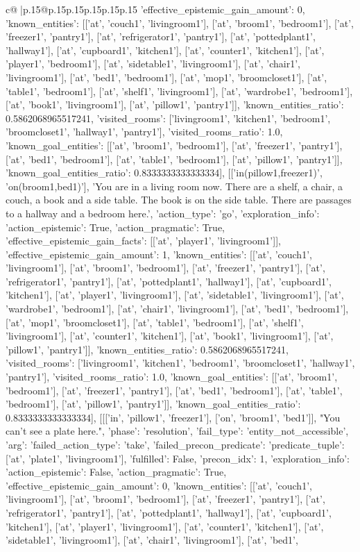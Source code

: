 \documentclass{article}
\begin{document}
{\begin{supertabular}{c@{$\;$}|p{.15\linewidth}@{}p{.15\linewidth}p{.15\linewidth}p{.15\linewidth}p{.15\linewidth}p{.15\linewidth}}
{{{'effective_epistemic_gain_amount': 0, 'known_entities': [['at', 'couch1', 'livingroom1'], ['at', 'broom1', 'bedroom1'], ['at', 'freezer1', 'pantry1'], ['at', 'refrigerator1', 'pantry1'], ['at', 'pottedplant1', 'hallway1'], ['at', 'cupboard1', 'kitchen1'], ['at', 'counter1', 'kitchen1'], ['at', 'player1', 'bedroom1'], ['at', 'sidetable1', 'livingroom1'], ['at', 'chair1', 'livingroom1'], ['at', 'bed1', 'bedroom1'], ['at', 'mop1', 'broomcloset1'], ['at', 'table1', 'bedroom1'], ['at', 'shelf1', 'livingroom1'], ['at', 'wardrobe1', 'bedroom1'], ['at', 'book1', 'livingroom1'], ['at', 'pillow1', 'pantry1']], 'known_entities_ratio': 0.5862068965517241, 'visited_rooms': ['livingroom1', 'kitchen1', 'bedroom1', 'broomcloset1', 'hallway1', 'pantry1'], 'visited_rooms_ratio': 1.0, 'known_goal_entities': [['at', 'broom1', 'bedroom1'], ['at', 'freezer1', 'pantry1'], ['at', 'bed1', 'bedroom1'], ['at', 'table1', 'bedroom1'], ['at', 'pillow1', 'pantry1']], 'known_goal_entities_ratio': 0.8333333333333334}}], [['in(pillow1,freezer1)', 'on(broom1,bed1)'], 'You are in a living room now. There are a shelf, a chair, a couch, a book and a side table. The book is on the side table. There are passages to a hallway and a bedroom here.', {'action_type': 'go', 'exploration_info': {'action_epistemic': True, 'action_pragmatic': True, 'effective_epistemic_gain_facts': [['at', 'player1', 'livingroom1']], 'effective_epistemic_gain_amount': 1, 'known_entities': [['at', 'couch1', 'livingroom1'], ['at', 'broom1', 'bedroom1'], ['at', 'freezer1', 'pantry1'], ['at', 'refrigerator1', 'pantry1'], ['at', 'pottedplant1', 'hallway1'], ['at', 'cupboard1', 'kitchen1'], ['at', 'player1', 'livingroom1'], ['at', 'sidetable1', 'livingroom1'], ['at', 'wardrobe1', 'bedroom1'], ['at', 'chair1', 'livingroom1'], ['at', 'bed1', 'bedroom1'], ['at', 'mop1', 'broomcloset1'], ['at', 'table1', 'bedroom1'], ['at', 'shelf1', 'livingroom1'], ['at', 'counter1', 'kitchen1'], ['at', 'book1', 'livingroom1'], ['at', 'pillow1', 'pantry1']], 'known_entities_ratio': 0.5862068965517241, 'visited_rooms': ['livingroom1', 'kitchen1', 'bedroom1', 'broomcloset1', 'hallway1', 'pantry1'], 'visited_rooms_ratio': 1.0, 'known_goal_entities': [['at', 'broom1', 'bedroom1'], ['at', 'freezer1', 'pantry1'], ['at', 'bed1', 'bedroom1'], ['at', 'table1', 'bedroom1'], ['at', 'pillow1', 'pantry1']], 'known_goal_entities_ratio': 0.8333333333333334}}], [[['in', 'pillow1', 'freezer1'], ['on', 'broom1', 'bed1']], "You can't see a plate here.", {'phase': 'resolution', 'fail_type': 'entity_not_accessible', 'arg': {'failed_action_type': 'take', 'failed_precon_predicate': {'predicate_tuple': ['at', 'plate1', 'livingroom1'], 'fulfilled': False, 'precon_idx': 1}}, 'exploration_info': {'action_epistemic': False, 'action_pragmatic': True, 'effective_epistemic_gain_amount': 0, 'known_entities': [['at', 'couch1', 'livingroom1'], ['at', 'broom1', 'bedroom1'], ['at', 'freezer1', 'pantry1'], ['at', 'refrigerator1', 'pantry1'], ['at', 'pottedplant1', 'hallway1'], ['at', 'cupboard1', 'kitchen1'], ['at', 'player1', 'livingroom1'], ['at', 'counter1', 'kitchen1'], ['at', 'sidetable1', 'livingroom1'], ['at', 'chair1', 'livingroom1'], ['at', 'bed1', }}}
\end{supertabular}}
\end{document}
